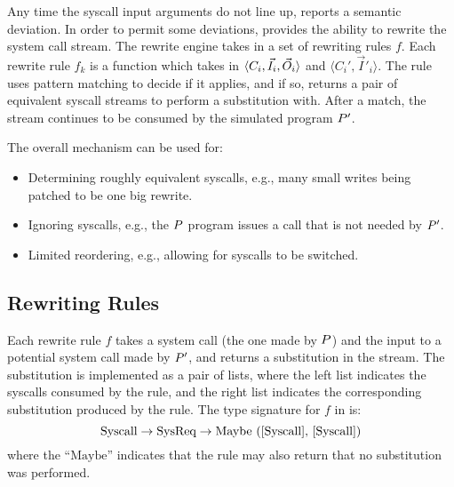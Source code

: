 Any time the syscall input arguments do not line up, \tachyon reports a
semantic deviation.  In order to permit some deviations, \tachyon
provides the ability to rewrite the system call stream.  The rewrite
engine takes in a set of rewriting rules $f$.  Each rewrite rule $f_k$
is a function which takes in $\langle C_i, \vec{I}_i, \vec{O}_i \rangle$ and
$\langle C_i', \vec{I}'_i \rangle$. 
The rule uses pattern matching
to decide if it applies, and if so, returns a pair of equivalent syscall
streams to perform a substitution with.
After a
match, the stream continues to be consumed by the simulated program $P'$. 


The overall mechanism can be used for:
\begin{itemize}
\item Determining roughly equivalent  syscalls, e.g., many small
  writes being patched to be one big rewrite.
\item Ignoring syscalls, e.g., the $P$ program issues a call
  that is not needed by $P'$. 
\item Limited reordering, e.g., allowing for syscalls to be switched.
\end{itemize}




\subsection{Rewriting Rules}

Each rewrite rule $f$ takes a system call (the one made by $P$)
and the input to a potential system call made by $P'$, and
returns a substitution in the stream. The substitution is implemented
as a pair of lists, where the left list indicates the syscalls
consumed by the rule, and the right list indicates the corresponding
substitution produced by the rule.  The type signature for $f$ in
\tachyon is:
\[
\text{Syscall}  \rightarrow \text{SysReq} \rightarrow \text{Maybe ([Syscall],
  [Syscall])}
\]
\noindent where the ``$\text{Maybe}$'' indicates that the rule may also return that
no substitution was performed. 


